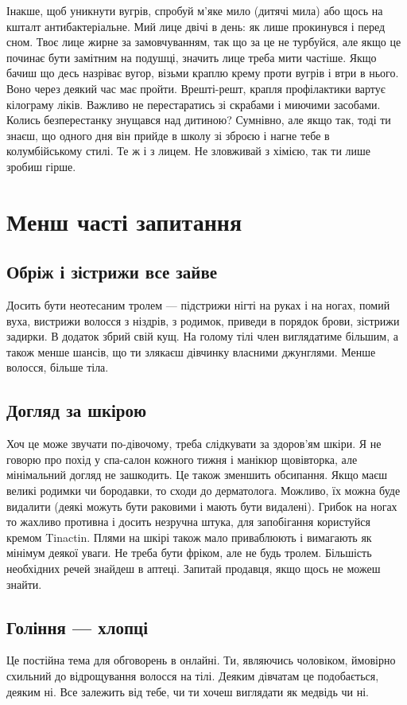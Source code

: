 Інакше, щоб уникнути вугрів, спробуй м’яке мило (дитячі мила) або щось
на кшталт антибактеріальне. Мий лице двічі в день: як лише прокинувся і перед
сном. Твоє лице жирне за замовчуванням, так що за це не турбуйся, але якщо це
починає бути замітним на подушці, значить лице треба мити частіше. Якщо бачиш
що десь назріває вугор, візьми краплю крему проти вугрів і втри в нього. Воно
через деякий час має пройти. Врешті-решт, крапля профілактики вартує кілограму
ліків. Важливо не перестаратись зі скрабами і миючими засобами. Колись
безперестанку знущався над дитиною? Сумнівно, але якщо так, тоді ти знаєш, що
одного дня він прийде в школу зі зброєю і нагне тебе в колумбійському стилі.
Те ж і з лицем. Не зловживай з хімією, так ти лише зробиш гірше.

\chapter{Менш часті запитання}
\section{Обріж і зістрижи все зайве}
Досить бути неотесаним тролем — підстрижи нігті на руках і на ногах, помий
вуха, вистрижи волосся з ніздрів, з родимок, приведи в порядок брови, зістрижи
задирки. В додаток збрий свій кущ. На голому тілі член виглядатиме більшим, а
також менше шансів, що ти злякаєш дівчинку власними джунглями. Менше волосся,
більше тіла.

\section{Догляд за шкірою}

Хоч це може звучати по-дівочому, треба слідкувати за здоров’ям шкіри. Я не
говорю про похід у спа-салон кожного тижня і манікюр щовівторка, але
мінімальний догляд не зашкодить. Це також зменшить обсипання. Якщо маєш великі
родимки чи бородавки, то сходи до дерматолога. Можливо, їх можна буде видалити
(деякі можуть бути раковими і мають бути видалені). Грибок на ногах то жахливо
противна і досить незручна штука, для запобігання користуйся кремом Tinactin.
Плями на шкірі також мало приваблюють і вимагають як мінімум деякої уваги. Не
треба бути фріком, але не будь тролем. Більшість необхідних речей знайдеш в
аптеці. Запитай продавця, якщо щось не можеш знайти.

\section{Гоління — хлопці}
Це постійна тема для обговорень в онлайні. Ти, являючись чоловіком, ймовірно
схильний до відрощування волосся на тілі. Деяким дівчатам це подобається,
деяким ні. Все залежить від тебе, чи ти хочеш виглядати як медвідь чи ні.

